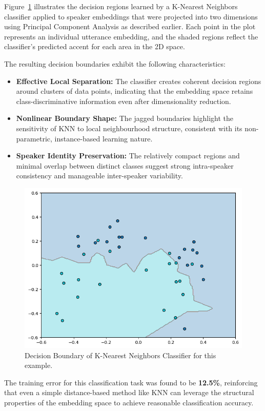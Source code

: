\documentclass[conference]{IEEEtran}
\begin{document}

Figure~\ref{fig:knn-shl-ilo} illustrates the decision regions learned by a K-Nearest Neighbors classifier applied to speaker embeddings that were projected into two dimensions using Principal Component Analysis as described earlier. Each point in the plot represents an individual utterance embedding, and the shaded regions reflect the classifier’s predicted accent for each area in the 2D space.

The resulting decision boundaries exhibit the following characteristics:

\begin{itemize}
	\item \textbf{Effective Local Separation:} The classifier creates coherent decision regions around clusters of data points, indicating that the embedding space retains class-discriminative information even after dimensionality reduction.
	\item \textbf{Nonlinear Boundary Shape:} The jagged boundaries highlight the sensitivity of KNN to local neighbourhood structure, consistent with its non-parametric, instance-based learning nature.
	\item \textbf{Speaker Identity Preservation:} The relatively compact regions and minimal overlap between distinct classes suggest strong intra-speaker consistency and manageable inter-speaker variability.
\end{itemize}


\begin{figure}[H]
	\centering
	\includegraphics[width=0.7\linewidth]{img/img-knn-shl-ilo.png}
	\caption{Decision Boundary of K-Nearest Neighbors Classifier for this example.}
	\label{fig:knn-shl-ilo}
\end{figure}

The training error for this classification task was found to be \textbf{12.5\%}, reinforcing that even a simple distance-based method like KNN can leverage the structural properties of the embedding space to achieve reasonable classification accuracy.
\end{document}
